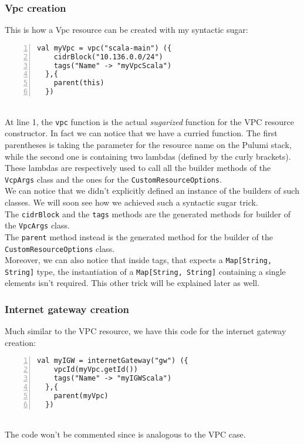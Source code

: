 \subsubsection{Vpc creation}
\label{sssec:vpc-creation-scala}
This is how a Vpc resource can be created with my syntactic sugar:
\begin{lstlisting}[numbers=left, numberstyle=\tiny, numbersep=-5pt, stepnumber=1]
  val myVpc = vpc("scala-main") ({
    cidrBlock("10.136.0.0/24")
    tags("Name" -> "myVpcScala")
  },{
    parent(this)
  })
\end{lstlisting}\mbox{}\\
At line 1, the \texttt{vpc} function is the actual \textit{sugarized} function for the VPC resource constructor.
In fact we can notice that we have a curried function.
The first parentheses is taking the parameter for the resource name on the Pulumi stack, while the second one is containing two lambdas (defined by the curly brackets).
These lambdas are respectively used to call all the builder methods of the \texttt{VcpArgs} class and the ones for the \texttt{CustomResourceOptions}.\\
We can notice that we didn't explicitly defined an instance of the builders of such classes.
We will soon see how we achieved such a syntactic sugar trick.\\
The \texttt{cidrBlock} and the \texttt{tags} methods are the generated methods for builder of the \texttt{VpcArgs} class.\\ 
The \texttt{parent} method instead is the generated method for the builder of the \texttt{CustomResourceOptions} class.\\
Moreover, we can also notice that inside tags, that expects a \texttt{Map[String, String]} type, the instantiation of a \texttt{Map[String, String]} containing a single elements isn't required.
This other trick will be explained later as well.

\subsubsection{Internet gateway creation}
Much similar to the VPC resource, we have this code for the internet gateway creation:
\begin{lstlisting}[numbers=left, numberstyle=\tiny, numbersep=-5pt, stepnumber=1]
  val myIGW = internetGateway("gw") ({
    vpcId(myVpc.getId())
    tags("Name" -> "myIGWScala")
  },{
    parent(myVpc)
  })
\end{lstlisting}\mbox{}\\
The code won't be commented since is analogous to the VPC case.

